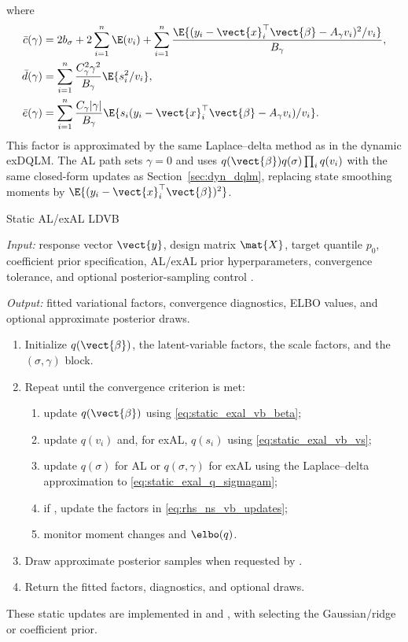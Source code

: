 where
\begin{align}
\bar c(\gamma)
&=2b_\sigma+2\sum_{i=1}^n\E(v_i)
+\sum_{i=1}^n
\frac{\E\{(y_i-\vect{x}_i^\top\vect{\beta}-A_\gamma v_i)^2/v_i\}}
{B_\gamma},\\
\bar d(\gamma)
&=\sum_{i=1}^n\frac{C_\gamma^2\gamma^2}{B_\gamma}\E\{s_i^2/v_i\},\\
\bar e(\gamma)
&=\sum_{i=1}^n
\frac{C_\gamma|\gamma|}{B_\gamma}
\E\{s_i(y_i-\vect{x}_i^\top\vect{\beta}-A_\gamma v_i)/v_i\}.
\end{align}
This factor is approximated by the same Laplace--delta method as in the
dynamic exDQLM. The AL path sets $\gamma=0$ and uses
$q(\vect{\beta})q(\sigma)\prod_iq(v_i)$ with the same closed-form updates as
Section~\ref{sec:dyn_dqlm}, replacing state smoothing moments by
$\E\{(y_i-\vect{x}_i^\top\vect{\beta})^2\}$.

\begin{suppalgorithm}{Static AL/exAL LDVB}
\label{alg:static-ldvb}
\par\noindent\emph{Input:} response vector $\vect{y}$, design matrix
$\mat{X}$, target quantile $p_0$, coefficient prior specification, AL/exAL
prior hyperparameters, convergence tolerance, and optional posterior-sampling
control .
\par\noindent\emph{Output:} fitted variational factors, convergence
diagnostics, ELBO values, and optional approximate posterior draws.
\begin{enumerate}[label=(\arabic*)]
\item Initialize $q(\vect{\beta})$, the latent-variable factors, the scale
factors, and the $(\sigma,\gamma)$ block.
\item Repeat until the convergence criterion is met:
  \begin{enumerate}[label=(\alph*)]
  \item update $q(\vect{\beta})$ using \eqref{eq:static_exal_vb_beta};
  \item update $q(v_i)$ and, for exAL, $q(s_i)$ using
  \eqref{eq:static_exal_vb_vs};
  \item update $q(\sigma)$ for AL or $q(\sigma,\gamma)$ for exAL using the
  Laplace--delta approximation to \eqref{eq:static_exal_q_sigmagam};
  \item if , update the  factors in
  \eqref{eq:rhs_ns_vb_updates};
  \item monitor moment changes and $\elbo(q)$.
  \end{enumerate}
\item Draw approximate posterior samples when requested by .
\item Return the fitted factors, diagnostics, and optional draws.
\end{enumerate}
\end{suppalgorithm}
These static updates are implemented in  and
, with  selecting the Gaussian/ridge
or  coefficient prior.


